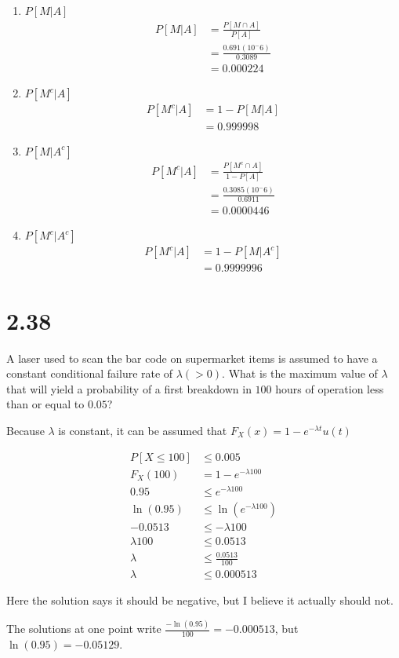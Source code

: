 \documentclass[12pt]{article}
\newcommand{\mysection}[1]{\section*{#1}}
\begin{document}
\begin{enumerate}
  \item $P[M|A]$\\
    \begin{align*}
      P[M|A]&=\frac{P[M\cap A]}{P[A]}\\
            &=\frac{0.691(10^-6)}{0.3089}\\
            &=0.000224
    \end{align*}
  \item $P[M^c|A]$\\
    \begin{align*}
      P[M^c|A]&=1-P[M|A]\\
              &=0.999998
    \end{align*}
  \item $P[M|A^c]$\\
    \begin{align*}
      P[M^c|A]&=\frac{P[M^c\cap A]}{1-P[A]}\\
            &=\frac{0.3085(10^-6)}{0.6911}\\
            &=0.0000446
    \end{align*}
  \item $P[M^c|A^c]$\\
    \begin{align*}
      P[M^c|A]&=1-P[M|A^c]\\
            &=0.9999996
    \end{align*}
\end{enumerate}
\newpage


\mysection{2.38}
A laser used to scan the bar code on supermarket items is assumed to have a constant conditional failure
rate of $\lambda(>0)$. What is the maximum value of $\lambda$ that will yield a probability of a first
breakdown in $100$ hours of operation less than or equal to $0.05$?

Because $\lambda$ is constant, it can be assumed that $F_X(x)=1-e^{-\lambda t}u(t)$

\begin{align*}
  P[X\leq100]&\leq 0.005 \\
  F_X(100)&=1-e^{-\lambda 100}\\
  0.95&\leq e^{-\lambda 100}\\
  \ln{(0.95)}&\leq \ln(e^{-\lambda 100})\\
 -0.0513&\leq -\lambda 100\\
 \lambda 100 &\leq 0.0513\\
 \lambda &\leq \frac{0.0513}{100}\\
 \lambda &\leq 0.000513
\end{align*}

  Here the solution says it should be negative, but I believe it actually should not. 

  The solutions at one point write $\frac{-\ln(0.95)}{100}=-0.000513$, but $\ln(0.95)=-0.05129$.
\newpage
\end{document}
